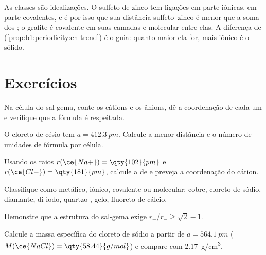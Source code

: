 \begin{remark}[Um contínuo]\label{rem:b1:crystals-ionic-covalent:continuum}
As classes são idealizações. O sulfeto de zinco tem ligações em parte
iônicas, em parte covalentes, e é por isso que sua distância
sulfeto--zinco é menor que a soma dos ; o grafite é
covalente em suas camadas e molecular entre elas. A diferença de
 (\cref{prop:b1:periodicity:en-trend}) é o guia:
quanto maior ela for, mais iônico é o sólido.
\end{remark}

\section{Exercícios}

\begin{exercise}[$\star$]\label{exo:b1:crystals-ionic-covalent:1}
Na célula do sal-gema, conte os cátions e os ânions, dê a coordenação de
cada um e verifique que a fórmula  é respeitada.
\end{exercise}

\begin{exercise}[$\star$]\label{exo:b1:crystals-ionic-covalent:2}
O cloreto de césio tem $a = \qty{412.3}{pm}$. Calcule a menor distância
 e o número de unidades de fórmula por célula.
\end{exercise}

\begin{exercise}[$\star$]\label{exo:b1:crystals-ionic-covalent:3}
Usando os raios $r(\ce{Na+}) = \qty{102}{pm}$ e $r(\ce{Cl-}) =
\qty{181}{pm}$, calcule a  de  e preveja a
coordenação do cátion.
\end{exercise}

\begin{exercise}[$\star$]\label{exo:b1:crystals-ionic-covalent:4}
Classifique como metálico, iônico, covalente ou molecular: cobre,
cloreto de sódio, diamante, di-iodo, quartzo , gelo, fluoreto
de cálcio.
\end{exercise}

\begin{exercise}[$\star\star$]\label{exo:b1:crystals-ionic-covalent:5}
Demonstre que a estrutura do sal-gema exige $r_+/r_- \ge \sqrt2 - 1$.
\end{exercise}

\begin{exercise}[$\star\star$]\label{exo:b1:crystals-ionic-covalent:6}
Calcule a massa específica do cloreto de sódio a partir de
$a = \qty{564.1}{pm}$ ($M(\ce{NaCl}) = \qty{58.44}{g/mol}$) e compare
com \qty{2.17}{g/cm^3}.
\end{exercise}

